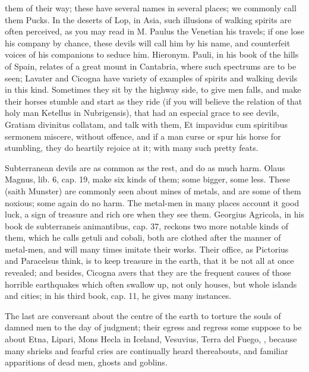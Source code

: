 {{them of their way; these have several names in several places; we
commonly call them Pucks. In the deserts of Lop, in Asia, such
illusions of walking spirits are often perceived, as you may read in M.
Paulus the Venetian his travels; if one lose his company by chance,
these devils will call him by his name, and counterfeit voices of his
companions to seduce him. Hieronym. Pauli, in his book of the hills of
Spain, relates of a great mount in Cantabria, where such
spectrums are to be seen; Lavater and Cicogna have variety of examples
of spirits and walking devils in this kind. Sometimes they sit by the
highway side, to give men falls, and make their horses stumble and
start as they ride (if you will believe the relation of that holy man
Ketellus in Nubrigensis), that had an especial grace to see
devils, Gratiam divinitus collatam, and talk with them, Et impavidus
cum spiritibus sermonem miscere, without offence, and if a man curse or
spur his horse for stumbling, they do heartily rejoice at it; with many
such pretty feats.

Subterranean devils are as common as the rest, and do as much harm.
Olaus Magnus, lib. 6, cap. 19, make six kinds of them; some bigger,
some less. These (saith Munster) are commonly seen about mines of
metals, and are some of them noxious; some again do no harm. The
metal-men in many places account it good luck, a sign of treasure and
rich ore when they see them. Georgius Agricola, in his book de
subterraneis animantibus, cap. 37, reckons two more notable kinds of
them, which he calls getuli and cobali, both are clothed after
the manner of metal-men, and will many times imitate their works. Their
office, as Pictorius and Paracelsus think, is to keep treasure in the
earth, that it be not all at once revealed; and besides, Cicogna
avers that they are the frequent causes of those horrible earthquakes
which often swallow up, not only houses, but whole islands and cities;
in his third book, cap. 11, he gives many instances.

The last are conversant about the centre of the earth to torture the
souls of damned men to the day of judgment; their egress and regress
some suppose to be about Etna, Lipari, Mons Hecla in Iceland, Vesuvius,
Terra del Fuego, \etc{}, because many shrieks and fearful cries are
continually heard thereabouts, and familiar apparitions of dead men,
ghosts and goblins.

}}
